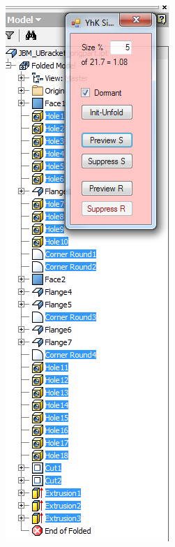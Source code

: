 \begin{minipage}{\linewidth}
\begin{minipage}[c]{0.62\linewidth}
\end{minipage}
\quad
\begin{minipage}[c]{0.3\linewidth}
\includegraphics[width=\linewidth,valign=t]{images/JBM_UBracket_PhI_tree}
 \label{fig:results:JBM_UBracket_PhItree}
\end{minipage}
\end{minipage}
%
%
%



